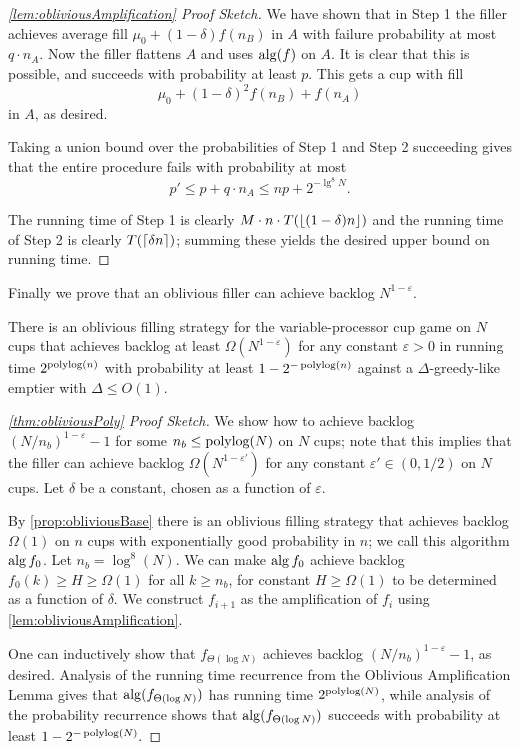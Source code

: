 \begin{proof}[\cref{lem:obliviousAmplification} Proof Sketch]
We have shown that in Step 1 the filler achieves average fill
$\mu_0 + (1-\delta)f(n_B)$ in $A$ with failure probability at
most $q \cdot n_A$.
Now the filler flattens $A$ and uses $\operatorname{\text{\textup{alg}}}(f)$ on $A$.
It is clear that this is possible, and succeeds with probability
at least $p$.
This gets a cup with fill 
$$\mu_0 + (1-\delta)^2 f(n_B) + f(n_A)$$
in $A$, as desired.

Taking a union bound over the probabilities of Step 1 and Step 2
succeeding gives that the entire procedure fails with probability
at most 
$$p' \le p + q \cdot n_A \le np + 2^{-\lg^8 N}.$$

The running time of Step 1 is clearly $M\cdot n\cdot
T(\left\lfloor (1-\delta)n \right\rfloor)$ and the running time of Step 2 is clearly
$T(\left\lceil \delta n \right\rceil)$; summing these yields the desired upper
bound on running time.

\end{proof}

Finally we prove that an oblivious filler can achieve backlog
$N^{1-\varepsilon}$. 
\begin{theorem}
  There is an oblivious filling strategy for the
  variable-processor cup game on $N$ cups that achieves backlog
  at least $\Omega(N^{1-\varepsilon})$ for any constant $\varepsilon
  >0$ in running time $2^{\operatorname{\text{polylog}}(n)}$ with probability at least
  $1-2^{-\operatorname{\text{polylog}}(n)}$ against a $\Delta$-greedy-like emptier
  with $\Delta \le O(1)$.
\end{theorem}
\begin{proof}[\cref{thm:obliviousPoly} Proof Sketch]
  We show how to achieve backlog $(N/n_b)^{1-\varepsilon}-1$ for
  some $n_b \le \operatorname{\text{polylog}}(N)$ on $N$ cups; note that this implies
  that the filler can achieve backlog
  $\Omega(N^{1-\varepsilon'})$ for any constant $\varepsilon' \in
  (0,1/2)$ on $N$ cups. Let $\delta$ be a constant, chosen as a
  function of $\varepsilon$.

  By \cref{prop:obliviousBase} there is an oblivious filling
  strategy that achieves backlog $\Omega(1)$ on $n$ cups with
  exponentially good probability in $n$; we call this algorithm
  $\operatorname{\text{\textup{alg}}}{f_0}$. Let $n_b = \log^8(N)$. We can make $\operatorname{\text{\textup{alg}}}{f_0}$
  achieve backlog $f_0(k) \ge H \ge \Omega(1)$ for all $k \ge
  n_b$, for constant $H \ge \Omega(1)$ to be determined as a
  function of $\delta$. We construct $f_{i+1}$ as the
  amplification of $f_i$ using \cref{lem:obliviousAmplification}.

  One can inductively show that $f_{\Theta(\log N)}$ achieves
  backlog $(N/n_b)^{1-\varepsilon} -1$, as desired. 
  Analysis of the running time recurrence from the Oblivious Amplification
  Lemma gives that $\operatorname{\text{\textup{alg}}}(f_{\Theta(\log N)})$ has running time
  $2^{\operatorname{\text{polylog}}(N)}$, while analysis of the probability recurrence
  shows that $\operatorname{\text{\textup{alg}}}(f_{\Theta(\log N)})$ succeeds with probability
  at least $1-2^{-\operatorname{\text{polylog}}(N)}.$
\end{proof}

